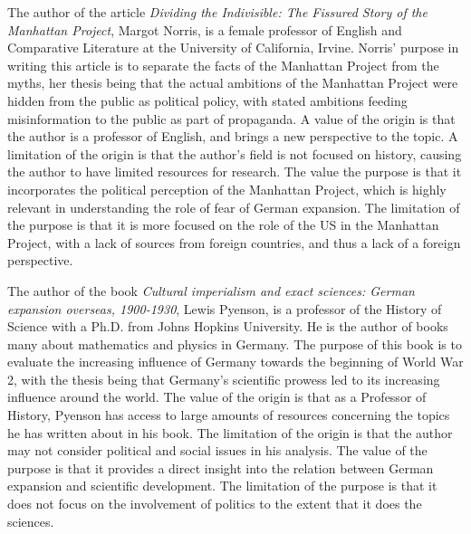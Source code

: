 \documentclass[a4paper,12pt]{article}
\begin{document}
        The author of the article \textit{Dividing the Indivisible: The Fissured Story of the
        Manhattan Project}, Margot Norris, is a female professor of English and Comparative
        Literature at the University of California, Irvine. Norris' purpose in writing this article
        is to separate the facts of the Manhattan Project from the myths, her thesis being that the
        actual ambitions of the Manhattan Project were hidden from the public as political policy,
        with stated ambitions feeding misinformation to the public as part of propaganda. A value of
        the origin is that the author is a professor of English, and brings a new perspective to the
        topic. A limitation of the origin is that the author's field is not focused on history,
        causing the author to have limited resources for research. The value the purpose is that it
        incorporates the political perception of the Manhattan Project, which is highly relevant in
        understanding the role of fear of German expansion. The limitation of the purpose is that it
        is more focused on the role of the US in the Manhattan Project, with a lack of sources from
        foreign countries, and thus a lack of a foreign perspective.

        The author of the book \textit{Cultural imperialism and exact sciences: German expansion
        overseas, 1900-1930}, Lewis Pyenson, is a professor of the History of Science with a Ph.D.
        from Johns Hopkins University. He is the author of books many about mathematics and physics
        in Germany. The purpose of this book is to evaluate the increasing influence of Germany
        towards the beginning of World War 2, with the thesis being that Germany's scientific
        prowess led to its increasing influence around the world. The value of the origin is that as
        a Professor of History, Pyenson has access to large amounts of resources concerning the
        topics he has written about in his book. The limitation of the origin is that the author may
        not consider political and social issues in his analysis. The value of the purpose is that
        it provides a direct insight into the relation between German expansion and scientific
        development. The limitation of the purpose is that it does not focus on the involvement of
        politics to the extent that it does the sciences.


\end{document}
